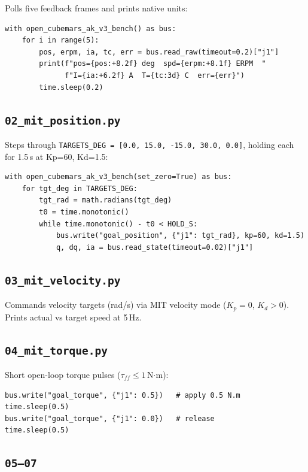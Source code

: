 \documentclass[11pt,a4paper]{article}
\begin{document}
Polls five feedback frames and prints native units:

\begin{lstlisting}
with open_cubemars_ak_v3_bench() as bus:
    for i in range(5):
        pos, erpm, ia, tc, err = bus.read_raw(timeout=0.2)["j1"]
        print(f"pos={pos:+8.2f} deg  spd={erpm:+8.1f} ERPM  "
              f"I={ia:+6.2f} A  T={tc:3d} C  err={err}")
        time.sleep(0.2)
\end{lstlisting}

\subsection{\texttt{02\_mit\_position.py}}

Steps through \texttt{TARGETS\_DEG = [0.0, 15.0, -15.0, 30.0, 0.0]},
holding each for 1.5\,s at Kp=60, Kd=1.5:

\begin{lstlisting}
with open_cubemars_ak_v3_bench(set_zero=True) as bus:
    for tgt_deg in TARGETS_DEG:
        tgt_rad = math.radians(tgt_deg)
        t0 = time.monotonic()
        while time.monotonic() - t0 < HOLD_S:
            bus.write("goal_position", {"j1": tgt_rad}, kp=60, kd=1.5)
            q, dq, ia = bus.read_state(timeout=0.02)["j1"]
\end{lstlisting}

\subsection{\texttt{03\_mit\_velocity.py}}

Commands velocity targets (rad/s) via MIT velocity mode
($K_p = 0$, $K_d > 0$).  Prints actual vs target speed at 5\,Hz.

\subsection{\texttt{04\_mit\_torque.py}}

Short open-loop torque pulses ($\tau_{ff} \le 1$\,N$\cdot$m):
\begin{lstlisting}
bus.write("goal_torque", {"j1": 0.5})   # apply 0.5 N.m
time.sleep(0.5)
bus.write("goal_torque", {"j1": 0.0})   # release
time.sleep(0.5)
\end{lstlisting}

\subsection{\texttt{05--07}}
\end{document}

